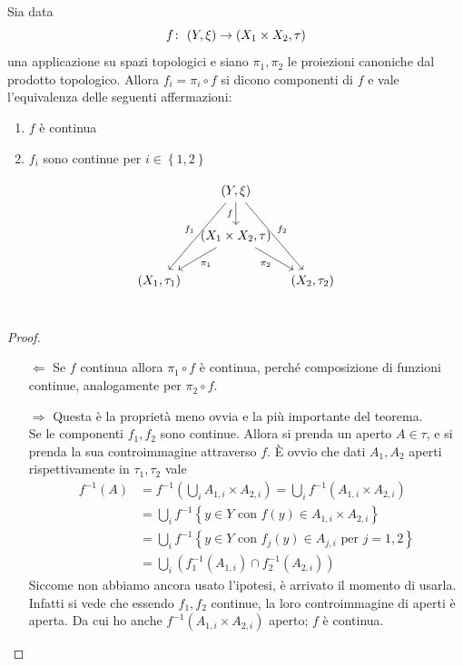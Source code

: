 \begin{theorem}
	Sia data 
	\begin{equation*}
	f \colon\ (Y, \xi) \rightarrow (X_1 \times X_2, \tau)
	\end{equation*}
	una applicazione su spazi topologici e siano $\pi_1,\pi_2$ le proiezioni canoniche dal prodotto topologico. Allora $f_i = \pi_i \circ f$ si dicono componenti di $f$ e vale l'equivalenza delle seguenti affermazioni:
	\begin{enumerate}
		\item $f$ è continua
		\item $f_i$ sono continue per $i \in \left\{1,2\right\}$
	\end{enumerate}
	\begin{equation*}
	\begin{tikzcd}[column sep=0.7em]
	& (Y, \xi) \arrow[swap]{d}{f} \arrow[swap]{ddl}{f_1} \arrow{ddr}{f_2} & \\
	& (X_1 \times X_2, \tau) \arrow[swap]{dr}{\pi_2} \arrow{dl}{\pi_1} & \\
	(X_1, \tau_1) &  & (X_2, \tau_2)\\
	\end{tikzcd}
	\end{equation*}

\end{theorem}
\begin{proof} \
	\begin{enumerate}
		\item[$\Leftarrow$] Se $f$ continua allora $\pi_1 \circ f$ è continua, perché composizione di funzioni continue, analogamente per $\pi_2 \circ f$.
		\item[$\Rightarrow$] Questa è la proprietà meno ovvia e la più importante del teorema. \\ Se le componenti $f_1, f_2$ sono continue. Allora si prenda un aperto $A \in \tau$, e si prenda la sua controimmagine attraverso $f$. È ovvio che dati $A_{1}, A_{2}$ aperti rispettivamente in $\tau_1, \tau_2$ vale
		\begin{align*}
		f^{-1}(A) & = f^{-1}\left(\bigcup_i A_{1,i} \times A_{2,i}\right)=\bigcup_i f^{-1}\left(A_{1,i} \times A_{2,i}\right)\\
		& = \bigcup_i f^{-1}\left\{y \in Y \text{ con } f(y) \in A_{1,i} \times A_{2,i}\right\}\\ 
		& = \bigcup_i f^{-1}\left\{y \in Y \text{ con } f_j(y) \in A_{j,i} \text{ per $j=1,2$}\right\}\\
		& = \bigcup_i \left(f_1^{-1}(A_{1,i})\cap f_2^{-1}(A_{2,i})\right)
		\end{align*}
		Siccome non abbiamo ancora usato l'ipotesi, è arrivato il momento di usarla. Infatti si vede che essendo $f_1, f_2$ continue, la loro controimmagine di aperti è aperta. Da cui ho anche $f^{-1}(A_{1,i} \times A_{2,i})$ aperto; $f$ è continua. 
	\end{enumerate}
\end{proof}
